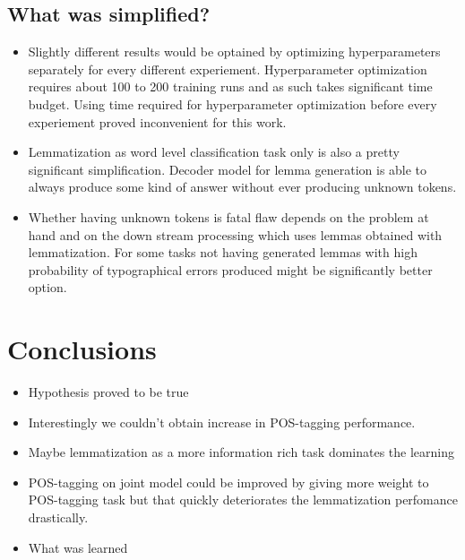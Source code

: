 \documentclass[12pt,a4paper,english
]{tutthesis}
\begin{document}
\section{What was simplified?}
\begin{itemize}
\item Slightly different results would be optained by optimizing hyperparameters separately for every different experiement. Hyperparameter optimization requires about 100 to 200 training runs and as such takes significant time budget. Using time required for hyperparameter optimization before every experiement proved inconvenient for this work.
\item Lemmatization as word level classification task only is also a pretty significant simplification. Decoder model for lemma generation is able to always produce some kind of answer without ever producing unknown tokens.
\item Whether having unknown tokens is fatal flaw depends on the problem at hand and on the down stream processing which uses lemmas obtained with lemmatization. For some tasks not having generated lemmas with high probability of typographical errors produced might be significantly better option.
\end{itemize}


\chapter{Conclusions}
\label{ch:conclusions}
\begin{itemize}
\item Hypothesis proved to be true
\item Interestingly we couldn't obtain increase in POS-tagging performance.
\item Maybe lemmatization as a more information rich task dominates the learning
\item POS-tagging on joint model could be improved by giving more weight to POS-tagging task but that quickly deteriorates the lemmatization perfomance drastically.
\item What was learned
\end{itemize}

%
%
\newpage



\renewcommand{\bibname}{Bibliography}     %
\addcontentsline{toc}{chapter}{\bibname}  %
\end{document}
